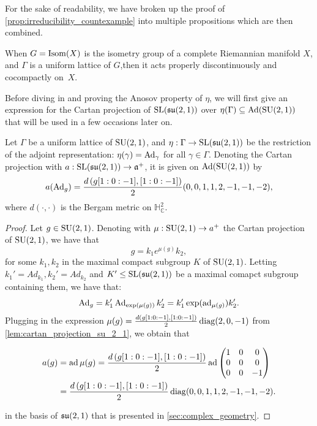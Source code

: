 \documentclass{report}
\begin{document}
For the sake of readability, we have broken up the proof of \cref{prop:irreducibility_countexample} into multiple propositions which are then combined.



\begin{remark}
    When $G = \operatorname{Isom}(X)$ is the isometry group of a complete Riemannian manifold $X$, and $\Gamma$ is a uniform lattice of $G$,then it acts properly discontinuously and cocompactly on~$X$.
\end{remark}

Before diving in and proving the Anosov property of $\eta$, we will first give an expression for the Cartan projection of $\operatorname{{\mathrm{SL}}}(\operatorname{{\mathfrak{su}}}(2,1))$ over $\eta(\Gamma) \subseteq \operatorname{Ad}(\operatorname{{\mathrm{SU}}}(2,1))$ that will be used in a few occasions later on.
\begin{lemma}\label{lem:cartan_projection_ad}
    Let $\Gamma$ be a uniform lattice of $\operatorname{{\mathrm{SU}}}(2,1)$, and $\eta: \Gamma \to \operatorname{{\mathrm{SL}}}(\mathfrak{su}(2,1))$ be the restriction of the adjoint representation: $\eta(\gamma) = \operatorname{Ad}_{\gamma}$ for all $\gamma \in \Gamma$. 
    Denoting the Cartan projection with $a: \operatorname{{\mathrm{SL}}}(\operatorname{{\mathfrak{su}}}(2,1)) \to \mathfrak a^+$, it is given on $\operatorname{Ad}(\operatorname{{\mathrm{SU}}}(2,1))$ by
    \[
    a(\operatorname{Ad}_g) = \frac{d\left(g [1:0:-1], [1:0:-1]\right)}{2} (0, 0, 1, 1, 2, -1, -1, -2),
    \]
    where $d(\cdot, \cdot)$ is the Bergam metric on $\mathbb H^2_{\mathbb C}$.
\end{lemma}
\begin{proof}
Let $g \in \operatorname{{\mathrm{SU}}}(2,1)$.
Denoting with $\mu: \operatorname{{\mathrm{SU}}}(2,1) \to a^+$ the Cartan projection of $\operatorname{{\mathrm{SU}}}(2,1)$, we have that
\[
g = k_1 e^{\mu(g)} k_2,
\]
for some $k_1, k_2$ in the maximal compact subgroup $K$ of $\operatorname{{\mathrm{SU}}}(2,1)$.
Letting $k_1' = Ad_{k_1}, k_2' = Ad_{k_2}$ and $K' \leq \operatorname{{\mathrm{SL}}}(\operatorname{{\mathfrak{su}}}(2,1))$ be a maximal comapct subgroup containing them, we have that:
\[
\operatorname{Ad}_{g} = k_1' \operatorname{Ad}_{\exp(\mu(g))} k_2' = k_1' \exp(\operatorname{ad}_{\mu(g)}) k_2'.
\]
Plugging in the expression $\mu(g) = \frac{d\left(g [1:0:-1], [1:0:-1]\right)}{2} \operatorname{diag}(2, 0, -1)$ from \cref{lem:cartan_projection_su_2_1}, we obtain that

\begin{align*}
    a(g) &= \operatorname{ad} \mu(g) = \frac{d\left(g [1:0:-1], [1:0:-1]\right)}{2} \operatorname{ad} \begin{pmatrix}
        1 & 0 & 0\\
        0 & 0 & 0\\
        0 & 0 & -1
    \end{pmatrix}\\
    &= \frac{d\left(g [1:0:-1], [1:0:-1]\right)}{2} \operatorname{diag}(0, 0, 1, 1, 2, -1, -1, -2).
\end{align*}

in the basis of $\operatorname{{\mathfrak{su}}}(2,1)$ that is presented in \cref{sec:complex_geometry}.
\end{proof}
\end{document}
